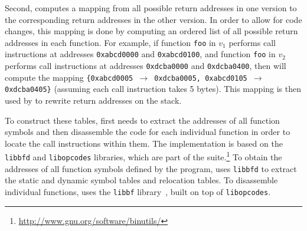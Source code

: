 Second, \sea computes a mapping from all possible return addresses in
one version to the corresponding return addresses in the other version.  In
order to allow for code changes, this mapping is done by computing an
ordered list of all possible return addresses in each function.  For
example, if function \lstinline`foo` in $v_1$ performs call instructions
at addresses \lstinline`0xabcd0000` and \lstinline`0xabcd0100`, and
function \lstinline`foo` in $v_2$ performs call instructions at
addresses \lstinline`0xdcba0000` and \lstinline`0xdcba0400`, then \sea
will compute the mapping \texttt{\{0xabcd0005 $\rightarrow$
0xdcba0005, 0xabcd0105 $\rightarrow$ 0xdcba0405\}} (assuming each call
instruction takes 5 bytes).  This mapping is then used by \rem to
rewrite return addresses on the stack.



To construct these tables, \sea first needs to extract the addresses
of all function symbols and then disassemble the code for each
individual function in order to locate the call instructions within
them.  The implementation is based on the \texttt{libbfd}
and \texttt{libopcodes} libraries, which are 
part of the
\gnu \binutils suite.\footnote{\url{http://www.gnu.org/software/binutils/}}
To obtain the addresses of all function symbols defined by the
program, \sea uses \texttt{libbfd} to extract the static and dynamic
symbol tables and relocation tables.  To disassemble individual
functions, \sea uses the \texttt{libbf}
library~\cite{kwan:libbf}, built on top of \texttt{libopcodes}.


